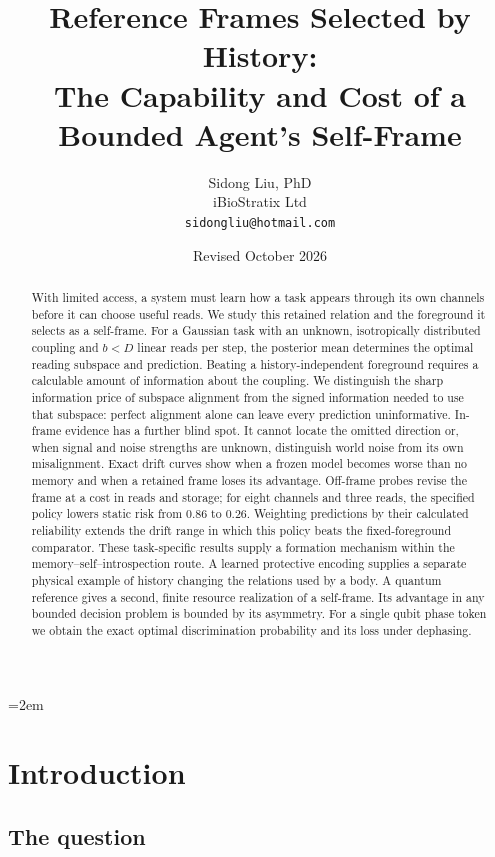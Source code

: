 \documentclass[12pt]{article}
\title{Reference Frames Selected by History:\\
The Capability and Cost of a Bounded Agent's Self-Frame}
\author{Sidong Liu, PhD \\
\small iBioStratix Ltd \\
\small \texttt{sidongliu@hotmail.com}}
\date{Revised October 2026}
\theoremstyle{definition}
\begin{document}
\emergencystretch=2em
\raggedbottom
\maketitle

\begin{abstract}
With limited access, a system must learn how a task appears through its own channels before it can choose useful reads. We study this retained relation and the foreground it selects as a self-frame. For a Gaussian task with an unknown, isotropically distributed coupling and $b<D$ linear reads per step, the posterior mean determines the optimal reading subspace and prediction. Beating a history-independent foreground requires a calculable amount of information about the coupling. We distinguish the sharp information price of subspace alignment from the signed information needed to use that subspace: perfect alignment alone can leave every prediction uninformative. In-frame evidence has a further blind spot. It cannot locate the omitted direction or, when signal and noise strengths are unknown, distinguish world noise from its own misalignment. Exact drift curves show when a frozen model becomes worse than no memory and when a retained frame loses its advantage. Off-frame probes revise the frame at a cost in reads and storage; for eight channels and three reads, the specified policy lowers static risk from $0.86$ to $0.26$. Weighting predictions by their calculated reliability extends the drift range in which this policy beats the fixed-foreground comparator. These task-specific results supply a formation mechanism within the memory--self--introspection route. A learned protective encoding supplies a separate physical example of history changing the relations used by a body.
A quantum reference gives a second, finite resource realization of a
self-frame. Its advantage in any bounded decision problem is bounded
by its asymmetry. For a single qubit phase token we obtain the exact
optimal discrimination probability and its loss under dephasing.
\end{abstract}

\section{Introduction}
\label{sec:intro}

\subsection{The question}
\end{document}
